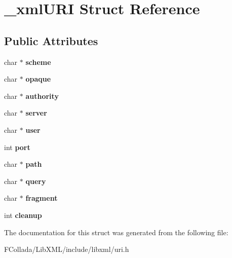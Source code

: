 \hypertarget{struct__xmlURI}{
\section{\_\-xmlURI Struct Reference}
\label{struct__xmlURI}
}
\subsection*{Public Attributes}
\begin{DoxyCompactItemize}
\item 
\hypertarget{struct__xmlURI_a897cb3959ee230d9e647ec2443440024}{
char $\ast$ {\bfseries scheme}}
\label{struct__xmlURI_a897cb3959ee230d9e647ec2443440024}

\item 
\hypertarget{struct__xmlURI_a40922d0937ac65c01ab443b85d7e0dd4}{
char $\ast$ {\bfseries opaque}}
\label{struct__xmlURI_a40922d0937ac65c01ab443b85d7e0dd4}

\item 
\hypertarget{struct__xmlURI_a0258d553bc7e5732559e085c229674b5}{
char $\ast$ {\bfseries authority}}
\label{struct__xmlURI_a0258d553bc7e5732559e085c229674b5}

\item 
\hypertarget{struct__xmlURI_a045a61b724d4d5d9c2c4b3c67e4bd120}{
char $\ast$ {\bfseries server}}
\label{struct__xmlURI_a045a61b724d4d5d9c2c4b3c67e4bd120}

\item 
\hypertarget{struct__xmlURI_a7179d65bb0a6e8b36562e562b7eb6c4a}{
char $\ast$ {\bfseries user}}
\label{struct__xmlURI_a7179d65bb0a6e8b36562e562b7eb6c4a}

\item 
\hypertarget{struct__xmlURI_a8460fd17316181c550e4f5b04e212eba}{
int {\bfseries port}}
\label{struct__xmlURI_a8460fd17316181c550e4f5b04e212eba}

\item 
\hypertarget{struct__xmlURI_a824d1521bda42a7d301a7a9c57484dc5}{
char $\ast$ {\bfseries path}}
\label{struct__xmlURI_a824d1521bda42a7d301a7a9c57484dc5}

\item 
\hypertarget{struct__xmlURI_ad6bacae3f53944b3224f8b8ae22a7126}{
char $\ast$ {\bfseries query}}
\label{struct__xmlURI_ad6bacae3f53944b3224f8b8ae22a7126}

\item 
\hypertarget{struct__xmlURI_ae291e87e8f3bae519660a4087efeaf39}{
char $\ast$ {\bfseries fragment}}
\label{struct__xmlURI_ae291e87e8f3bae519660a4087efeaf39}

\item 
\hypertarget{struct__xmlURI_a88f7bca5886e16c467eb1e1d4e729059}{
int {\bfseries cleanup}}
\label{struct__xmlURI_a88f7bca5886e16c467eb1e1d4e729059}

\end{DoxyCompactItemize}


The documentation for this struct was generated from the following file:\begin{DoxyCompactItemize}
\item 
FCollada/LibXML/include/libxml/uri.h\end{DoxyCompactItemize}
